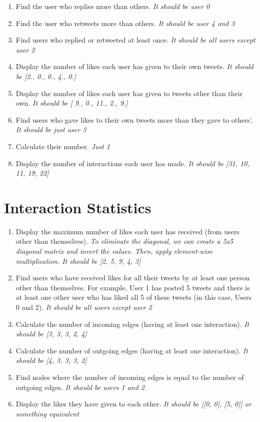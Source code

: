 \documentclass[11pt, a4paper]{article}
\newcommand{\cmt}[1]{\textit{\color{red}#1}}
\begin{document}
\begin{enumerate}
	\item Find the user who replies more than others. \cmt{It should be user 0}
	\item Find the user who retweets more than others. \cmt{It should be user 4 and 3}
	\item Find users who replied or retweeted at least once. \cmt{It should be all users except user 2}
	\item Display the number of likes each user has given to their own tweets. \cmt{It should be [2., 0., 0., 4., 0.]}
	\item Display the number of likes each user has given to tweets other than their own.
	\cmt{It should be [ 9.,  0., 11.,  2.,  9.]}
	\item Find users who gave likes to their own tweets more than they gave to others'.
	\cmt{It should be just user 3}
	\item Calculate their number. \cmt{Just 1}
	\item Display the number of interactions each user has made. \cmt{It should be [31, 10, 11, 19, 22]}
\end{enumerate}

\newpage
\section*{Interaction Statistics}

\begin{enumerate}
	\item Display the maximum number of likes each user has received (from users other than themselves).
	\textit{To eliminate the diagonal, we can create a 5x5 diagonal matrix and invert the values. Then, apply element-wise multiplication.}
	\cmt{It should be [2, 5, 9, 4, 3]}
	
	\item Find users who have received likes for all their tweets by at least one person other than themselves.
	For example, User 1 has posted 5 tweets and there is at least one other user who has liked all 5 of these tweets (in this case, Users 0 and 2).
	\cmt{It should be all users except user 2}
	
	\item Calculate the number of incoming edges (having at least one interaction).
	\cmt{It should be [3, 3, 3, 2, 4]}
	\item Calculate the number of outgoing edges (having at least one interaction).
	\cmt{It should be [4, 3, 3, 3, 2]}
	\item Find nodes where the number of incoming edges is equal to the number of outgoing edges.
	\cmt{It should be users 1 and 2}
	\item Display the likes they have given to each other.
	\cmt{It should be [[0, 0], [5, 0]] or something equivalent}
\end{enumerate}
\end{document}
